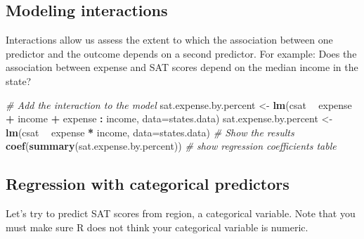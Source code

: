 \documentclass[]{book}
\newenvironment{Shaded}{\begin{snugshade}}{\end{snugshade}}
\newcommand{\KeywordTok}[1]{\textcolor[rgb]{0.13,0.29,0.53}{\textbf{#1}}}
\newcommand{\DataTypeTok}[1]{\textcolor[rgb]{0.13,0.29,0.53}{#1}}
\newcommand{\StringTok}[1]{\textcolor[rgb]{0.31,0.60,0.02}{#1}}
\newcommand{\CommentTok}[1]{\textcolor[rgb]{0.56,0.35,0.01}{\textit{#1}}}
\newcommand{\OperatorTok}[1]{\textcolor[rgb]{0.81,0.36,0.00}{\textbf{#1}}}
\newcommand{\NormalTok}[1]{#1}
\begin{document}
\subsection{Modeling interactions}\label{modeling-interactions}

Interactions allow us assess the extent to which the association between
one predictor and the outcome depends on a second predictor. For
example: Does the association between expense and SAT scores depend on
the median income in the state?

\begin{Shaded}
\begin{Highlighting}[]
    \CommentTok{# Add the interaction to the model}
\NormalTok{  sat.expense.by.percent <-}\StringTok{ }\KeywordTok{lm}\NormalTok{(csat }\OperatorTok{~}\StringTok{ }\NormalTok{expense }\OperatorTok{+}\StringTok{ }\NormalTok{income }\OperatorTok{+}\StringTok{ }\NormalTok{expense }\OperatorTok{:}\StringTok{ }\NormalTok{income, }\DataTypeTok{data=}\NormalTok{states.data)}
\NormalTok{  sat.expense.by.percent <-}\StringTok{ }\KeywordTok{lm}\NormalTok{(csat }\OperatorTok{~}\StringTok{ }\NormalTok{expense }\OperatorTok{*}\StringTok{ }\NormalTok{income, }\DataTypeTok{data=}\NormalTok{states.data) }
  \CommentTok{# Show the results}
    \KeywordTok{coef}\NormalTok{(}\KeywordTok{summary}\NormalTok{(sat.expense.by.percent)) }\CommentTok{# show regression coefficients table}
\end{Highlighting}
\end{Shaded}

\subsection{Regression with categorical
predictors}\label{regression-with-categorical-predictors}

Let's try to predict SAT scores from region, a categorical variable.
Note that you must make sure R does not think your categorical variable
is numeric.

\begin{Shaded}
\end{Shaded}
\end{document}
